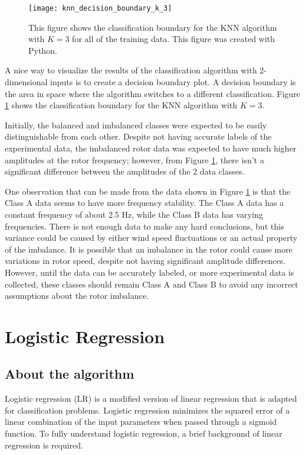 \begin{figure}
	\centering
	\texttt{[image: knn\_decision\_boundary\_k\_3]}
	\decoRule
	\caption{This figure shows the classification boundary for the KNN algorithm with $K=3$ for all of the training data.  This figure was created with Python.}
	\label{fig:knn_decision_boundary_k_3}
\end{figure}

A nice way to visualize the results of the classification algorithm with 2-dimensional inputs is to create a decision boundary plot.  A decision boundary is the area in space where the algorithm switches to a different classification.  Figure \ref{fig:knn_decision_boundary_k_3} shows the classification boundary for the KNN algorithm with $K=3$.

Initially, the balanced and imbalanced classes were expected to be easily distinguishable from each other.  Despite not having accurate labels of the experimental data, the imbalanced rotor data was expected to have much higher amplitudes at the rotor frequency; however, from Figure \ref{fig:knn_decision_boundary_k_3}, there isn't a significant difference between the amplitudes of the 2 data classes.

One observation that can be made from the data shown in Figure \ref{fig:knn_decision_boundary_k_3} is that the Class A data seems to have more frequency stability.  The Class A data has a constant frequency of about 2.5 Hz, while the Class B data has varying frequencies.  There is not enough data to make any hard conclusions, but this variance could be caused by either wind speed fluctuations or an actual property of the imbalance.  It is possible that an imbalance in the rotor could cause more variations in rotor speed, despite not having significant amplitude differences.  However, until the data can be accurately labeled, or more experimental data is collected, these classes should remain Class A and Class B to avoid any incorrect assumptions about the rotor imbalance.

\section{Logistic Regression}
\subsection{About the algorithm}
Logistic regression (LR) is a modified version of linear regression that is adapted for classification problems.  Logistic regression minimizes the squared error of a linear combination of the input parameters when passed through a sigmoid function.  To fully understand logistic regression, a brief background of linear regression is required. 

